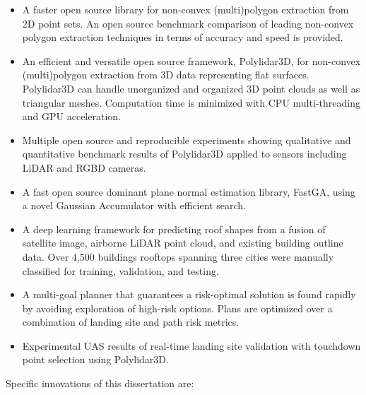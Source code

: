 \begin{itemize}[noitemsep]
  \item A faster open source library for non-convex (multi)polygon extraction from 2D point sets. An open source benchmark comparison of leading non-convex polygon extraction techniques in terms of accuracy and speed is provided. %
  \item An efficient and versatile open source framework, Polylidar3D,  for non-convex (multi)polygon extraction from 3D data representing flat surfaces. Polylidar3D can handle unorganized and organized 3D point clouds as well as triangular meshes. Computation time is minimized with CPU multi-threading and GPU acceleration. %
  \item Multiple open source and reproducible experiments showing qualitative and quantitative benchmark results of Polylidar3D applied to sensors including LiDAR and RGBD cameras.
  \item A fast open source dominant plane normal estimation library, FastGA,  using a novel Gaussian Accumulator with efficient search.
  \item A deep learning framework for predicting roof shapes from a fusion of satellite image, airborne LiDAR point cloud, and existing building outline data. Over 4,500 buildings rooftops spanning three cities were manually classified  for training, validation, and testing.
  \item A multi-goal planner that guarantees a risk-optimal solution is found rapidly by avoiding exploration of high-risk options. Plans are optimized over a combination of landing site and path risk metrics.
  \item Experimental UAS results of real-time landing site validation with touchdown point selection using Polylidar3D.
\end{itemize}
 
Specific innovations of this dissertation are: %

